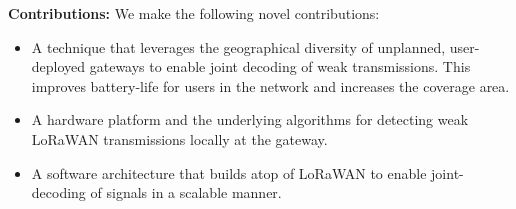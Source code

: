 \noindent \textbf{Contributions:} We make the following novel contributions:
\begin{itemize}
    \item A technique that leverages the geographical diversity of unplanned,
        user-deployed gateways to enable joint decoding of weak transmissions.
        This improves battery-life for users in the network and increases the
        coverage area.
    \item A hardware platform and the underlying algorithms for detecting weak
        LoRaWAN transmissions locally at the gateway.
    \item A software architecture that builds atop of LoRaWAN to enable
        joint-decoding of signals in a scalable manner.
\end{itemize}